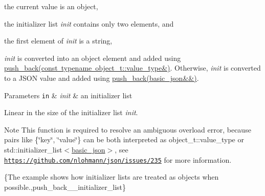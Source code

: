 \begin{DoxyEnumerate}
\item the current value is an object,
\item the initializer list {\itshape init} contains only two elements, and
\item the first element of {\itshape init} is a string,
\end{DoxyEnumerate}

{\itshape init} is converted into an object element and added using \mbox{\hyperlink{classnlohmann_1_1basic__json_ae11a3a51782c058fff2f6550cdfb9b3c}{push\+\_\+back(const typename object\+\_\+t\+::value\+\_\+type\&)}}. Otherwise, {\itshape init} is converted to a J\+S\+ON value and added using \mbox{\hyperlink{classnlohmann_1_1basic__json_ac8e523ddc8c2dd7e5d2daf0d49a9c0d7}{push\+\_\+back(basic\+\_\+json\&\&)}}.


\begin{DoxyParams}[1]{Parameters}
\mbox{\tt in}  & {\em init} & an initializer list\\
\hline
\end{DoxyParams}
Linear in the size of the initializer list {\itshape init}.

\begin{DoxyNote}{Note}
This function is required to resolve an ambiguous overload error, because pairs like {\ttfamily \{\char`\"{}key\char`\"{}, \char`\"{}value\char`\"{}\}} can be both interpreted as {\ttfamily object\+\_\+t\+::value\+\_\+type} or {\ttfamily std\+::initializer\+\_\+list$<$\mbox{\hyperlink{classnlohmann_1_1basic__json}{basic\+\_\+json}}$>$}, see \href{https://github.com/nlohmann/json/issues/235}{\tt https\+://github.\+com/nlohmann/json/issues/235} for more information.
\end{DoxyNote}
\{The example shows how initializer lists are treated as objects when possible.,push\+\_\+back\+\_\+\+\_\+initializer\+\_\+list\} \mbox{\label{classnlohmann_1_1basic__json_aab256df8c5594ec693035822fa1e2904}} 
